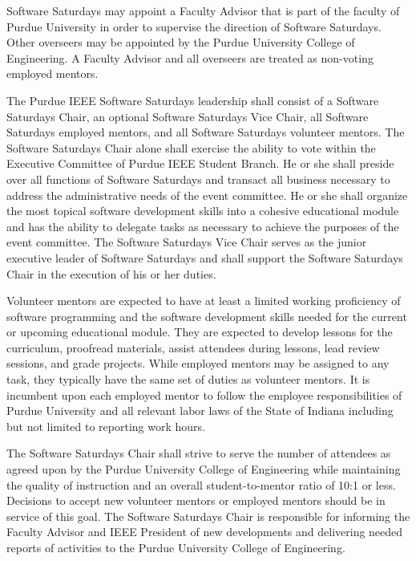 \documentclass[12pt]{constitution}
\begin{document}
Software Saturdays may appoint a Faculty Advisor that is part of the faculty of Purdue University in order to supervise the direction of Software Saturdays. Other overseers may be appointed by the Purdue University College of Engineering. A Faculty Advisor and all overseers are treated as non-voting employed mentors.

\label{art:leader}

The Purdue IEEE Software Saturdays leadership shall consist of a Software Saturdays Chair, an optional Software Saturdays Vice Chair, all Software Saturdays employed mentors, and all Software Saturdays volunteer mentors. The Software Saturdays Chair alone shall exercise the ability to vote within the Executive Committee of Purdue IEEE Student Branch. He or she shall preside over all functions of Software Saturdays and transact all business necessary to address the administrative needs of the event committee. He or she shall organize the most topical software development skills into a cohesive educational module and has the ability to delegate tasks as necessary to achieve the purposes of the event committee. The Software Saturdays Vice Chair serves as the junior executive leader of Software Saturdays and shall support the Software Saturdays Chair in the execution of his or her duties.

Volunteer mentors are expected to have at least a limited working proficiency of software programming and the software development skills needed for the current or upcoming educational module. They are expected to develop lessons for the curriculum, proofread materials, assist attendees during lessons, lead review sessions, and grade projects. While employed mentors may be assigned to any task, they typically have the same set of duties as volunteer mentors. It is incumbent upon each employed mentor to follow the employee responsibilities of Purdue University and all relevant labor laws of the State of Indiana including but not limited to reporting work hours.

The Software Saturdays Chair shall strive to serve the number of attendees as agreed upon by the Purdue University College of Engineering while maintaining the quality of instruction and an overall student-to-mentor ratio of 10:1 or less. Decisions to accept new volunteer mentors or employed mentors should be in service of this goal. The Software Saturdays Chair is responsible for informing the Faculty Advisor and IEEE President of new developments and delivering needed reports of activities to the Purdue University College of Engineering.
\end{document}
